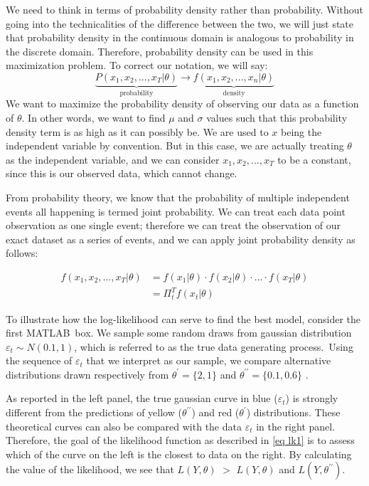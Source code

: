 \documentclass[a4paper,12pt]{article}%
\begin{document}
We need to think in terms of probability density rather than probability.
Without going into the technicalities of the difference between the two, we
will just state that probability density in the continuous domain is analogous
to probability in the discrete domain. Therefore, probability density can be
used in this maximization problem. To correct our notation, we will say:%
\[
\underset{\text{probability}}{\underbrace{P\left(  x_{1},x_{2},...,x_{T}%
|\theta\right)  }}\rightarrow\underset{\text{density}}{\underbrace{f\left(
x_{1},x_{2},...,x_{n}|\theta\right)  }}%
\]
We want to \textsf{maximize the probability density of observing our data as a
function of }$\theta$. In other words, we want to find $\mu$ and $\sigma$
values such that this probability density term is as high as it can possibly
be. We are used to $x$ being the independent variable by convention. But in
this case, we are actually treating $\theta$ as the independent variable, and
we can consider $x_{1},x_{2},...,x_{T}$ to be a constant, since this is our
observed data, which cannot change.

From probability theory, we know that the probability of multiple independent
events all happening is termed \textsf{joint probability}. We can treat each
data point observation as one single event; therefore we can treat the
observation of our exact dataset as a series of events, and we can apply joint
probability density as follows:%

\begin{align}
f\left(  x_{1},x_{2},...,x_{T}|\theta\right)   &  =f\left(  x_{1}%
|\theta\right)  \cdot f\left(  x_{2}|\theta\right)  \cdot...\cdot f\left(
x_{T}|\theta\right) \label{eq lk1}\\
&  =\Pi_{t}^{T}f\left(  x_{t}|\theta\right) \nonumber
\end{align}


To illustrate how the log-likelihood can serve to find the best model,
consider the first MATLAB\ box. We sample some random draws from gaussian
distribution $\varepsilon_{t}\sim N(0.1,1)$, which is referred to as the true
data generating process.\ Using the sequence of $\varepsilon_{t}$ that we
interpret as our sample, we compare alternative distributions drawn
respectively from $\theta^{\prime}=\{2,1\}$ and $\theta^{\prime\prime
}=\{0.1,0.6\}$ .%

%


As reported in the left panel, the true gaussian curve in blue ($\varepsilon
_{t}$) is strongly different from the predictions of yellow ($\theta
^{\prime\prime}$) and red ($\theta^{\prime}$) distributions. These theoretical
curves can also be compared with the data $\varepsilon_{t}$ in the right
panel. Therefore, the goal of the likelihood function as described in
\autoref{eq lk1} is to assess which of the curve on the left is the closest to
data on the right. By calculating the value of the likelihood, we see that
$L\left(  Y,\theta\right)  $%
$>$
$L\left(  Y,\theta\right)  $ and $L\left(  Y,\theta^{\prime\prime}\right)  $.
\end{document}
